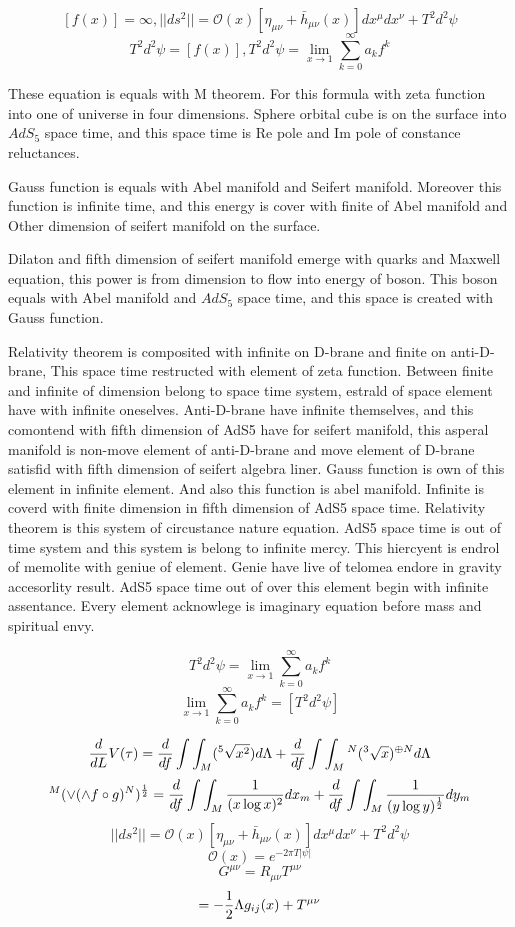 \documentclass{jsarticle}
\begin{document}
$$ [f(x)] = \infty, ||ds^2|| = \mathcal{O}(x)[\eta_{\mu\nu} + \bar{h}_{\mu\nu}(x)]dx^{\mu}dx^{\nu} + T^2 d^2 \psi $$
$$ T^2 d^2 \psi = [f(x)] , T^2 d^2 \psi = \lim_{x \to 1}\sum_{k=0}^{\infty}a_k f^k $$

 These equation is equals with M theorem. For this formula with zeta function into one of universe in four dimensions.
Sphere orbital cube is on the surface into $AdS_5$ space time, and this space time is Re pole and Im pole of 
constance reluctances.


  Gauss function is equals with Abel manifold and Seifert manifold. Moreover this function is infinite time,
and this energy is cover with finite of Abel manifold and Other dimension of seifert manifold on the surface.


  Dilaton and fifth dimension of seifert manifold emerge with quarks and Maxwell equation, this power
is from dimension to flow into energy of boson. 
This boson equals with Abel manifold and $AdS_5$ space time, and this space is created with Gauss function.


  Relativity theorem is composited with infinite on D-brane and finite on anti-D-brane, This space time
restructed with element of zeta function.
Between finite and infinite of dimension belong to space time system, estrald of space element have with 
infinite oneselves. Anti-D-brane have infinite themselves, and this comontend with fifth dimension of AdS5 
have for seifert manifold, this asperal manifold is non-move element of anti-D-brane and move element 
of D-brane satisfid with fifth dimension of seifert algebra liner.
Gauss function is own of this element in infinite element.
And also this function is abel manifold.
Infinite is coverd with finite dimension in fifth dimension of AdS5 space time.
Relativity theorem is this system of circustance nature equation.
AdS5 space time is out of time system and this system is belong to infinite mercy.
This hiercyent is endrol of memolite with geniue of element.
Genie have live of telomea endore in gravity accesorlity result.
AdS5 space time out of over this element begin with infinite assentance.
Every element acknowlege is imaginary equation before mass and spiritual envy.

  $$ T^2 d^2 \psi = \lim_{x \to 1}\sum_{k=0}^{\infty}a_k f^k $$
  $$ \lim_{x \to 1}\sum_{k=0}^{\infty}a_k f^k = [T^2 d^2 \psi] $$

  $$ {d \over dL}V(\tau)= {d \over df}\int \int_M({}^5\sqrt{x^2})d\Lambda 
  + {d \over df}\int \int_M {}^N({}^3\sqrt{x})^{\oplus N}d\Lambda $$
  $$ {}^M(\vee(\wedge f \circ g)^N)^{1 \over 2} = {d \over df}\int \int_M{1 \over (x \log x)^2}dx_m
  + {d \over df}\int \int_M{1 \over (y \log y)^{1 \over 2}}dy_m $$
  $$ ||ds^2|| = \mathcal{O}(x)[\eta_{\mu\nu} + \bar{h}_{\mu\nu}(x)]dx^{\mu}dx^{\nu}
  + T^2 d^2 \psi $$
  $$ \mathcal{O}(x) = e^{-2\pi T|\psi|} $$
  $$ G^{\mu\nu} = R_{\mu\nu} T^{\mu\nu} $$
  $$ = - {1 \over 2}\Lambda g_{ij}(x) + T^{\mu\nu} $$
\end{document}
